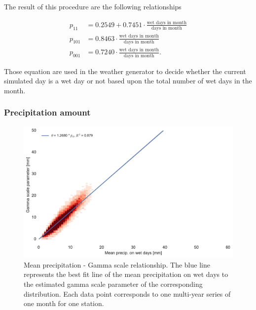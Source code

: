 \begin{refsection}
The result of this procedure are the following relationships

\begin{align}
	p_{11} &= 0.2549 + 0.7451\cdot \frac{\text{wet days in month}}{\text{days in month}} \label{eq:p11}\\
	p_{101} &= 0.8463 \cdot \frac{\text{wet days in month}}{\text{days in month}} \label{eq:p101}\\
	p_{001} &= 0.7240 \cdot \frac{\text{wet days in month}}{\text{days in month}}. \label{eq:p001}
\end{align}

Those equation are used in the weather generator to decide whether the current simulated day is a wet day or not based upon the total number of wet days in the month.

\subsubsection{Precipitation amount} \label{sec:dist_params}

\begin{figure}
	\includegraphics[width=12cm,page=1]{figures/prcp.pdf}
	\caption[Mean precipitation - Gamma scale relationship]{Mean precipitation - Gamma scale relationship. The blue line represents the best fit line of the mean precipitation on wet days to the estimated gamma scale parameter of the corresponding distribution. Each data point corresponds to one multi-year series of one month for one station.}
	\label{fig:gscale_meanw}
\end{figure}


\end{refsection}

